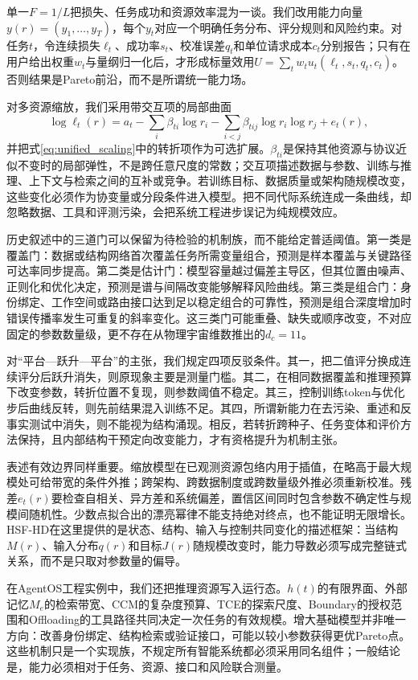 单一$F=1/L$把损失、任务成功和资源效率混为一谈。我们改用能力向量$y(r)=(y_1,\ldots,y_T)$，每个$y_t$对应一个明确任务分布、评分规则和风险约束。对任务$t$，令连续损失$\ell_t$、成功率$s_t$、校准误差$q_t$和单位请求成本$c_t$分别报告；只有在用户给出权重$w_t$与量纲归一化后，才形成标量效用$U=\sum_tw_tu_t(\ell_t,s_t,q_t,c_t)$。否则结果是Pareto前沿，而不是所谓统一能力场。

对多资源缩放，我们采用带交互项的局部曲面
\begin{equation}
\log \ell_t(r)=a_t-\sum_i\beta_{ti}\log r_i
-\sum_{i<j}\beta_{tij}\log r_i\log r_j+e_t(r),
\end{equation}
并把式\eqref{eq:unified_scaling}中的转折项作为可选扩展。$\beta_{ti}$是保持其他资源与协议近似不变时的局部弹性，不是跨任意尺度的常数；交互项描述数据与参数、训练与推理、上下文与检索之间的互补或竞争。若训练目标、数据质量或架构随规模改变，这些变化必须作为协变量或分段条件进入模型。把不同代际系统连成一条曲线，却忽略数据、工具和评测污染，会把系统工程进步误记为纯规模效应。

历史叙述中的三道门可以保留为待检验的机制族，而不能给定普适阈值。第一类是覆盖门：数据或结构网络首次覆盖任务所需变量组合，预测是样本覆盖与关键路径可达率同步提高。第二类是估计门：模型容量越过偏差主导区，但其位置由噪声、正则化和优化决定，预测是谱与间隔改变能够解释风险曲线。第三类是组合门：身份绑定、工作空间或路由接口达到足以稳定组合的可靠性，预测是组合深度增加时错误传播率发生可重复的斜率变化。这三类门可能重叠、缺失或顺序改变，不对应固定的参数数量级，更不存在从物理宇宙维数推出的$d_c=11$。

对“平台—跃升—平台”的主张，我们规定四项反驳条件。其一，把二值评分换成连续评分后跃升消失，则原现象主要是测量门槛。其二，在相同数据覆盖和推理预算下改变参数，转折位置不复现，则参数阈值不稳定。其三，控制训练token与优化步后曲线反转，则先前结果混入训练不足。其四，所谓新能力在去污染、重述和反事实测试中消失，则不能视为结构涌现。相反，若转折跨种子、任务变体和评价方法保持，且内部结构干预定向改变能力，才有资格提升为机制主张。

表述有效边界同样重要。缩放模型在已观测资源包络内用于插值，在略高于最大规模处可给带宽的条件外推；跨架构、跨数据制度或跨数量级外推必须重新校准。残差$e_t(r)$要检查自相关、异方差和系统偏差，置信区间同时包含参数不确定性与规模间随机性。少数点拟合出的漂亮幂律不能支持绝对终点，也不能证明无限增长。HSF-HD在这里提供的是状态、结构、输入与控制共同变化的描述框架：当结构$M(r)$、输入分布$q(r)$和目标$J(r)$随规模改变时，能力导数必须写成完整链式关系，而不是只取对参数量的偏导。

在AgentOS工程实例中，我们还把推理资源写入运行态。$h(t)$的有限界面、外部记忆$M_e$的检索带宽、CCM的复杂度预算、TCE的探索尺度、Boundary的授权范围和Offloading的工具路径共同决定一次任务的有效规模。增大基础模型并非唯一方向：改善身份绑定、结构检索或验证接口，可能以较小参数获得更优Pareto点。这些机制只是一个实现族，不规定所有智能系统都必须采用同名组件；一般结论是，能力必须相对于任务、资源、接口和风险联合测量。

